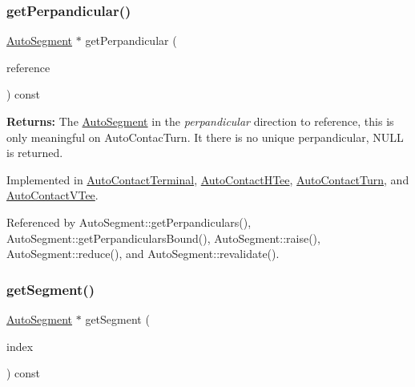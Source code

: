 \mbox{\label{classKatabatic_1_1AutoContact_a994371005874f946cc0ac78005d38423}} 
\subsubsection{\texorpdfstring{get\+Perpandicular()}{getPerpandicular()}}
{\footnotesize\ttfamily \hyperlink{classKatabatic_1_1AutoSegment}{Auto\+Segment} $\ast$ get\+Perpandicular (\begin{DoxyParamCaption}\item[{const \hyperlink{classKatabatic_1_1AutoSegment}{Auto\+Segment} $\ast$}]{reference }\end{DoxyParamCaption}) const\hspace{0.3cm}{\ttfamily [pure virtual]}}

{\bfseries Returns\+:} The \hyperlink{classKatabatic_1_1AutoSegment}{Auto\+Segment} in the {\itshape perpandicular} direction to {\ttfamily reference}, this is only meaningful on Auto\+Contac\+Turn. It there is no unique perpandicular, {\ttfamily N\+U\+LL} is returned. 

Implemented in \hyperlink{classKatabatic_1_1AutoContactTerminal_ad99dd549214e43b6509fd8e3aefae919}{Auto\+Contact\+Terminal}, \hyperlink{classKatabatic_1_1AutoContactHTee_ad99dd549214e43b6509fd8e3aefae919}{Auto\+Contact\+H\+Tee}, \hyperlink{classKatabatic_1_1AutoContactTurn_ad99dd549214e43b6509fd8e3aefae919}{Auto\+Contact\+Turn}, and \hyperlink{classKatabatic_1_1AutoContactVTee_ad99dd549214e43b6509fd8e3aefae919}{Auto\+Contact\+V\+Tee}.



Referenced by Auto\+Segment\+::get\+Perpandiculars(), Auto\+Segment\+::get\+Perpandiculars\+Bound(), Auto\+Segment\+::raise(), Auto\+Segment\+::reduce(), and Auto\+Segment\+::revalidate().

\mbox{\label{classKatabatic_1_1AutoContact_a50531ded68cc5206fe104b8d8bf3bd87}} 
\subsubsection{\texorpdfstring{get\+Segment()}{getSegment()}}
{\footnotesize\ttfamily \hyperlink{classKatabatic_1_1AutoSegment}{Auto\+Segment} $\ast$ get\+Segment (\begin{DoxyParamCaption}\item[{unsigned int}]{index }\end{DoxyParamCaption}) const\hspace{0.3cm}{\ttfamily [pure virtual]}}

